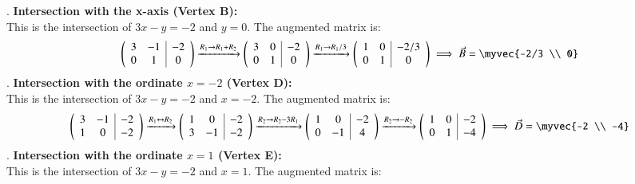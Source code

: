 \documentclass[journal]{IEEEtran}
\begin{document}
. \textbf{Intersection with the x-axis (Vertex B):}\\
This is the intersection of $3x - y = -2$ and $y=0$. The augmented matrix is:
\begin{equation}
    \left(\begin{array}{cc|c} 3 & -1 & -2 \\ 0 & 1 & 0 \end{array}\right)
    \xrightarrow{R_1 \to R_1 + R_2}
    \left(\begin{array}{cc|c} 3 & 0 & -2 \\ 0 & 1 & 0 \end{array}\right)
    \xrightarrow{R_1 \to R_1/3}
    \left(\begin{array}{cc|c} 1 & 0 & -2/3 \\ 0 & 1 & 0 \end{array}\right) \implies \vec{B} = \myvec{-2/3 \\ 0}
\end{equation}
. \textbf{Intersection with the ordinate $x=-2$ (Vertex D):}\\
This is the intersection of $3x - y = -2$ and $x=-2$. The augmented matrix is:
\begin{equation}
    \left(\begin{array}{cc|c} 3 & -1 & -2 \\ 1 & 0 & -2 \end{array}\right)
    \xrightarrow{R_1 \leftrightarrow R_2}
    \left(\begin{array}{cc|c} 1 & 0 & -2 \\ 3 & -1 & -2 \end{array}\right)
    \xrightarrow{R_2 \to R_2 - 3R_1}
    \left(\begin{array}{cc|c} 1 & 0 & -2 \\ 0 & -1 & 4 \end{array}\right)
    \xrightarrow{R_2 \to -R_2}
    \left(\begin{array}{cc|c} 1 & 0 & -2 \\ 0 & 1 & -4 \end{array}\right) \implies \vec{D} = \myvec{-2 \\ -4}
\end{equation}
. \textbf{Intersection with the ordinate $x=1$ (Vertex E):}\\
This is the intersection of $3x - y = -2$ and $x=1$. The augmented matrix is:
\end{document}
